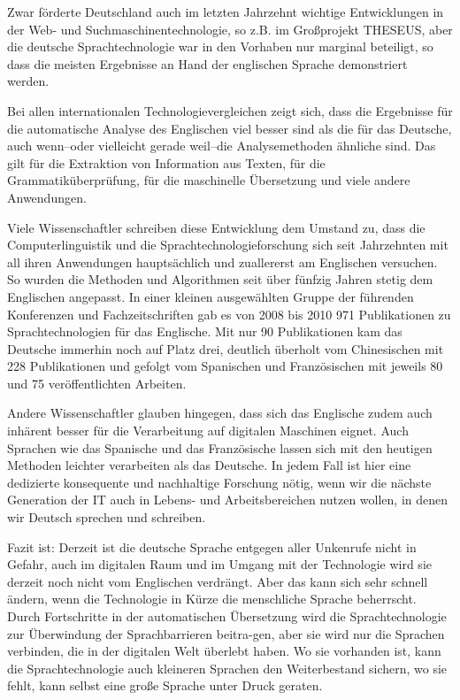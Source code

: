 \begin{multicols}{2}
Zwar förderte Deutschland auch im letzten Jahrzehnt wichtige Entwicklungen in der Web- und Suchmaschinentechnologie, so z.B. im Großprojekt THESEUS, aber die deutsche Sprachtechnologie war in den Vorhaben nur marginal beteiligt, so dass die meisten Ergebnisse an Hand der englischen Sprache demonstriert werden. 

Bei allen internationalen Technologievergleichen zeigt sich, dass die Ergebnisse für die automatische Analyse des Englischen viel besser sind als die für das Deutsche, auch wenn--oder vielleicht gerade weil--die Analysemethoden ähnliche sind.  Das gilt für die Extraktion von Information aus Texten, für die Grammatiküberprüfung, für die maschinelle Übersetzung und viele andere Anwendungen. 

Viele Wissenschaftler schreiben diese Entwicklung dem Umstand zu, dass die Computerlinguistik und die Sprachtechnologieforschung sich seit Jahrzehnten mit all ihren Anwendungen hauptsächlich und zuallererst am Englischen versuchen. So wurden die Methoden und Algorithmen seit über fünfzig Jahren stetig dem Englischen angepasst.  In einer kleinen ausgewählten Gruppe der führenden Konferenzen und Fachzeitschriften gab es von 2008 bis 2010 971 Publikationen zu Sprachtechnologien für das Englische. Mit nur 90 Publikationen kam das Deutsche immerhin noch auf Platz drei, deutlich überholt vom Chinesischen mit 228 Publikationen und gefolgt vom Spanischen und Französischen mit jeweils 80 und 75 veröffentlichten Arbeiten.
 
Andere Wissenschaftler glauben hingegen, dass sich das Englische zudem auch inhärent besser für die Verarbeitung auf digitalen Maschinen eignet.  Auch Sprachen wie das Spanische und das Französische lassen sich mit den heutigen Methoden leichter verarbeiten als das Deutsche. In jedem Fall ist hier eine dedizierte konsequente und nachhaltige Forschung nötig, wenn wir die nächste Generation der IT auch in Lebens- und Arbeitsbereichen nutzen wollen, in denen wir Deutsch sprechen und schreiben. 

Fazit ist: Derzeit ist die deutsche Sprache entgegen aller Unkenrufe nicht in Gefahr, auch im digitalen Raum und im Umgang mit der Technologie wird sie derzeit noch nicht vom Englischen verdrängt. Aber das kann sich sehr schnell ändern, wenn die Technologie in Kürze die menschliche Sprache beherrscht.  Durch Fortschritte in der automatischen Übersetzung wird die Sprachtechnologie zur Überwindung der Sprachbarrieren beitra-gen, aber sie wird nur die Sprachen verbinden, die in der digitalen Welt überlebt haben. Wo sie vorhanden ist, kann die Sprachtechnologie auch kleineren Sprachen den Weiterbestand sichern, wo sie fehlt, kann selbst eine große Sprache unter Druck geraten.


\end{multicols}
